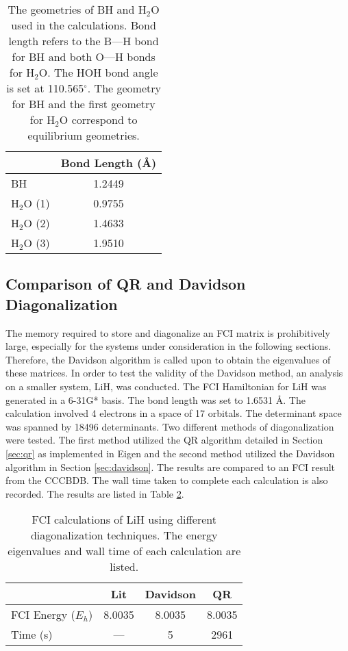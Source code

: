 \documentclass[final,3p,times,twocolumn]{elsarticle}
\begin{document}
\begin{table}
\centering
\begin{tabular}{l|c}
\hline\hline
& Bond Length (\AA) \\ \hline
BH & 1.2449 \\ \hline
H$_2$O (1) & 0.9755\\
H$_2$O (2) & 1.4633\\
H$_2$O (3) & 1.9510\\ \hline\hline
\end{tabular}
\caption{The geometries of BH and H$_2$O used in the calculations. Bond length refers to the B---H bond for BH and both O---H bonds for H$_2$O. The HOH bond angle is set at 110.565$^\circ$. The geometry for BH and the first geometry for H$_2$O correspond to equilibrium geometries.}
\label{tab:geo}
\end{table}


\subsection{Comparison of QR and Davidson Diagonalization}
The memory required to store and diagonalize an FCI matrix is prohibitively large, especially for the systems under consideration in the following sections. Therefore, the Davidson algorithm is called upon to obtain the eigenvalues of these matrices. In order to test the validity of the Davidson method, an analysis on a smaller system, LiH, was conducted. The FCI Hamiltonian for LiH was generated in a 6-31G* basis.\cite{bhbasis} The bond length was set to 1.6531 \AA. The calculation involved 4 electrons in a space of 17 orbitals. The determinant space was spanned by 18496 determinants. Two different methods of diagonalization were tested. The first method utilized the QR algorithm detailed in Section \ref{sec:qr} as implemented in Eigen\cite{eigen} and the second method utilized the Davidson algorithm in Section \ref{sec:davidson}. The results are compared to an FCI result from the CCCBDB.\cite{cccbdb} The wall time taken to complete each calculation is also recorded. The results are listed in Table \ref{tab:lihresults}.

\begin{table}
\centering
\begin{tabular}{l|ccc} \hline\hline
& Lit\cite{cccbdb} & Davidson & QR \\ \hline
FCI Energy ($E_h$) & 8.0035 & 8.0035 & 8.0035 \\
Time (s) & --- & 5 & 2961 \\ \hline\hline
\end{tabular}
\caption{FCI calculations of LiH using different diagonalization techniques. The energy eigenvalues and wall time of each calculation are listed.}
\label{tab:lihresults}
\end{table}
\end{document}
